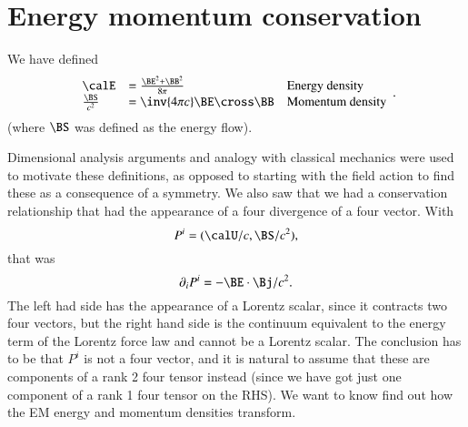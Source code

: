 %
%
\section{Energy momentum conservation}

We have defined
%
\begin{equation}\label{eqn:relativisticElectrodynamicsL21b:320}
\begin{array}{l l l}
\calE &= \frac{\BE^2 + \BB^2}{8\pi} & \mbox{Energy density} \\
\frac{\BS}{c^2} &= \inv{4 \pi c} \BE \cross \BB & \mbox{Momentum density}
\end{array}.
\end{equation}
%
(where \(\BS\) was defined as the energy flow).

Dimensional analysis arguments and analogy with classical mechanics were used to motivate these definitions, as opposed to starting with the field action to find these as a consequence of a symmetry.  We also saw that we had a conservation relationship that had the appearance of a four divergence of a four vector.  With
%
\begin{equation}\label{eqn:relativisticElectrodynamicsL21b:340}
P^i = (\calU/c, \BS/c^2),
\end{equation}
%
that was
%
\begin{equation}\label{eqn:relativisticElectrodynamicsL21b:360}
\partial_i P^i = - \BE \cdot \Bj/c^2.
\end{equation}
%
The left had side has the appearance of a Lorentz scalar, since it contracts two four vectors, but the right hand side is the continuum equivalent to the energy term of the Lorentz force law and cannot be a Lorentz scalar.  The conclusion has to be that \(P^i\) is not a four vector, and it is natural to assume that these are components of a rank 2 four tensor instead (since we have got just one component of a rank 1 four tensor on the RHS).  We want to know find out how the EM energy and momentum densities transform.
%
